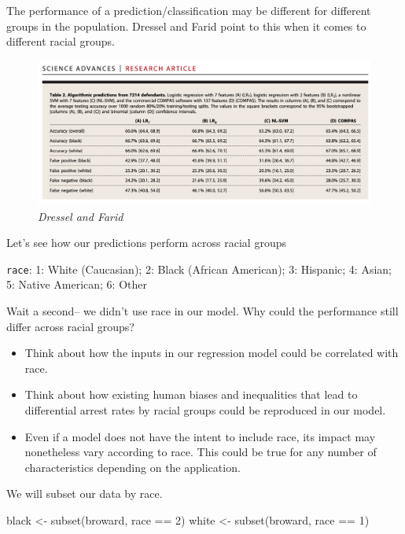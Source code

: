 \documentclass[
  letterpaper,
  DIV=11,
  numbers=noendperiod]{scrreprt}
\newenvironment{Shaded}{\begin{snugshade}}{\end{snugshade}}
\newcommand{\DecValTok}[1]{\textcolor[rgb]{0.68,0.00,0.00}{#1}}
\newcommand{\FunctionTok}[1]{\textcolor[rgb]{0.28,0.35,0.67}{#1}}
\newcommand{\NormalTok}[1]{\textcolor[rgb]{0.00,0.23,0.31}{#1}}
\newcommand{\OtherTok}[1]{\textcolor[rgb]{0.00,0.23,0.31}{#1}}
\newcommand{\SpecialCharTok}[1]{\textcolor[rgb]{0.37,0.37,0.37}{#1}}
\providecommand{\tightlist}{%
  \setlength{\itemsep}{0pt}\setlength{\parskip}{0pt}}\usepackage{longtable,booktabs,array}
\begin{document}
The performance of a prediction/classification may be different for
different groups in the population. Dressel and Farid point to this when
it comes to different racial groups.

\begin{figure}

{\centering \includegraphics{images/fair1.png}

}

\caption{\emph{Dressel and Farid}}

\end{figure}

Let's see how our predictions perform across racial groups

\texttt{race}: 1: White (Caucasian); 2: Black (African American); 3:
Hispanic; 4: Asian; 5: Native American; 6: Other

Wait a second-- we didn't use race in our model. Why could the
performance still differ across racial groups?

\begin{itemize}
\tightlist
\item
  Think about how the inputs in our regression model could be correlated
  with race.
\item
  Think about how existing human biases and inequalities that lead to
  differential arrest rates by racial groups could be reproduced in our
  model.
\item
  Even if a model does not have the intent to include race, its impact
  may nonetheless vary according to race. This could be true for any
  number of characteristics depending on the application.
\end{itemize}

We will subset our data by race.

\begin{Shaded}
\begin{Highlighting}[]
\NormalTok{black }\OtherTok{\textless{}{-}} \FunctionTok{subset}\NormalTok{(broward, race }\SpecialCharTok{==} \DecValTok{2}\NormalTok{)}
\NormalTok{white }\OtherTok{\textless{}{-}} \FunctionTok{subset}\NormalTok{(broward, race }\SpecialCharTok{==} \DecValTok{1}\NormalTok{)}
\end{Highlighting}
\end{Shaded}
\end{document}
